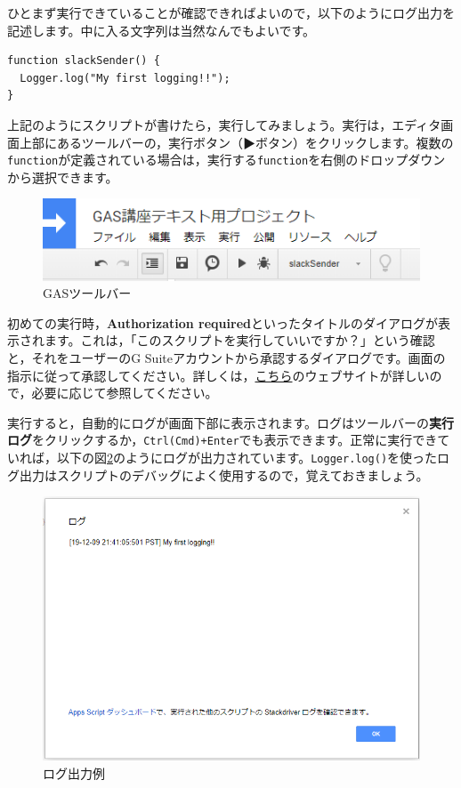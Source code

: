 \documentclass[uplatex,a4j]{jsarticle}
\begin{document}
ひとまず実行できていることが確認できればよいので，以下のようにログ出力を記述します。中に入る文字列は当然なんでもよいです。

\begin{lstlisting}[basicstyle=\ttfamily\footnotesize,frame=single,caption=Logging]
function slackSender() {
  Logger.log("My first logging!!");
}
\end{lstlisting}


上記のようにスクリプトが書けたら，実行してみましょう。実行は，エディタ画面上部にあるツールバーの，実行ボタン（▶ボタン）をクリックします。複数の\verb|function|が定義されている場合は，実行する\verb|function|を右側のドロップダウンから選択できます。

\begin{figure}[H]
 \centering
 \includegraphics[keepaspectratio, scale=0.7]{images/standalone_gas1.png}
 \caption{GASツールバー}
 \label{fig:standalone_gas1}
\end{figure}

初めての実行時，\textbf{Authorization required}といったタイトルのダイアログが表示されます。これは，「このスクリプトを実行していいですか？」という確認と，それをユーザーのG Suiteアカウントから承認するダイアログです。画面の指示に従って承認してください。詳しくは，\href{https://tonari-it.com/gas-script-approval/}{こちら}のウェブサイトが詳しいので，必要に応じて参照してください。

実行すると，自動的にログが画面下部に表示されます。ログはツールバーの\textbf{実行ログ}をクリックするか，\verb|Ctrl(Cmd)+Enter|でも表示できます。正常に実行できていれば，以下の図\ref{fig:standalone_gas2}のようにログが出力されています。\verb|Logger.log()|を使ったログ出力はスクリプトのデバッグによく使用するので，覚えておきましょう。

\begin{figure}[H]
 \centering
 \includegraphics[keepaspectratio, scale=0.7]{images/standalone_gas2.png}
 \caption{ログ出力例}
 \label{fig:standalone_gas2}
\end{figure}
\end{document}
